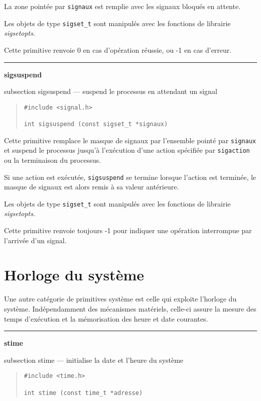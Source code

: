 \documentclass [twoside] {report}
\newcommand {\primitive} [1]
    {
	{\large \bf #1}
	\addcontentsline {toc} {subsection} {#1}
    }
\newcommand {\separation}
    {
	\vspace {7mm}
	\nopagebreak
	\hrule
    }
\begin{document}
La zone pointée par {\tt signaux} est remplie avec les signaux bloqués
en attente.

Les objets de type {\tt sigset\_t} sont manipulés avec les fonctions de
librairie {\em sigsetopts}.

Cette primitive renvoie 0 en cas d'opération réussie, ou -1 en cas
d'erreur.



\separation
\primitive {sigsuspend} --- suspend le processus en attendant un signal

\begin {quote}
\begin {verbatim}
#include <signal.h>

int sigsuspend (const sigset_t *signaux)
\end{verbatim}
\end {quote}

Cette primitive remplace le masque de signaux par l'ensemble pointé par
{\tt signaux} et suspend le processus jusqu'à l'exécution d'une action
spécifiée par {\tt sigaction} ou la terminaison du processus.

Si une action est exécutée, {\tt sigsuspend} se termine lorsque l'action
est terminée, le masque de signaux est alors remis à sa valeur
antérieure.

Les objets de type {\tt sigset\_t} sont manipulés avec les fonctions de
librairie {\em sigsetopts}.

Cette primitive renvoie toujours -1 pour indiquer une opération
interrompue par l'arrivée d'un signal.



\section {Horloge du système}


Une autre catégorie de primitives système est
celle qui exploite l'horloge du système.
Indépendamment des mécanismes matériels, celle-ci
assure la mesure des temps d'exé\-cu\-tion et la
mémorisation des heure et date courantes.



\separation
\primitive {stime} --- initialise la date et l'heure du système

\begin {quote}
\begin {verbatim}
#include <time.h>

int stime (const time_t *adresse)
\end{verbatim}
\end {quote}
\end{document}
